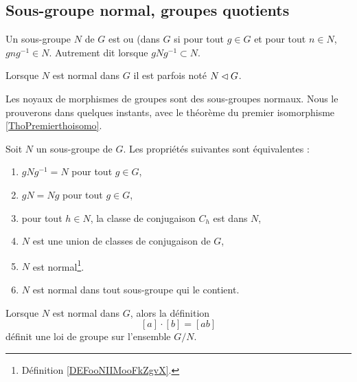 \subsection{Sous-groupe normal, groupes quotients}

\begin{definition}\label{DEFooNIIMooFkZgvX}
    Un sous-groupe \( N\) de \( G\) est  ou  (dans \( G \) si pour tout \( g\in G\) et pour tout \( n\in N\), \( gng^{-1}\in N\). Autrement dit lorsque \( gNg^{-1}\subset N\).

    Lorsque \( N\) est normal dans \( G\) il est parfois noté \( N\lhd G\).
\end{definition}

\begin{example}
  Les noyaux de morphismes de groupes sont des sous-groupes normaux. Nous le prouverons dans quelques instants, avec le théorème du premier isomorphisme \ref{ThoPremierthoisomo}.
\end{example}

\begin{proposition}\label{propGroupeNormal}
    Soit \( N\) un sous-groupe de \( G\). Les propriétés suivantes sont équivalentes :
    \begin{enumerate}
        \item
            \( gNg^{-1}= N\) pour tout \( g\in G\),
        \item
            \( gN=Ng\) pour tout \( g\in G\),
        \item
            pour tout \( h \in N \), la classe de conjugaison \( C_h \) est dans \( N \),
        \item
            \( N\) est une union de classes de conjugaison de \( G\),
        \item
            \( N\) est normal\footnote{Définition \ref{DEFooNIIMooFkZgvX}.}.
        \item
            \( N \) est normal dans tout sous-groupe qui le contient.
    \end{enumerate}
\end{proposition}

\begin{lemma}       \label{LEMooFNVRooRCkjLc}
    Lorsque \( N\) est normal dans \( G\), alors la définition
    \begin{equation}        \label{EQooEUESooSeUWHK}
        [a]\cdot[b]=[ab]
    \end{equation}
    définit une loi de groupe sur l'ensemble \( G/N\).
\end{lemma}

